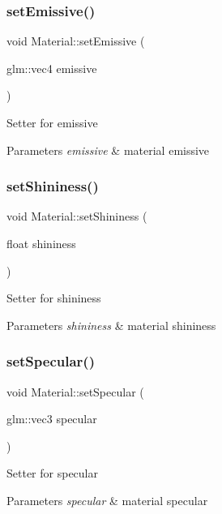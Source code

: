 \subsubsection{\texorpdfstring{set\+Emissive()}{setEmissive()}}
{\footnotesize\ttfamily void Material\+::set\+Emissive (\begin{DoxyParamCaption}\item[{glm\+::vec4}]{emissive }\end{DoxyParamCaption})}

Setter for emissive 
\begin{DoxyParams}{Parameters}
{\em emissive} & material emissive \\
\hline
\end{DoxyParams}
\mbox{\label{classMaterial_a329d0ae8403956a71b1d45b3284f7dd7}} 
\subsubsection{\texorpdfstring{set\+Shininess()}{setShininess()}}
{\footnotesize\ttfamily void Material\+::set\+Shininess (\begin{DoxyParamCaption}\item[{float}]{shininess }\end{DoxyParamCaption})}

Setter for shininess 
\begin{DoxyParams}{Parameters}
{\em shininess} & material shininess \\
\hline
\end{DoxyParams}
\mbox{\label{classMaterial_a7d26a46a86ab91a48a2073f15a3bbdcc}} 
\subsubsection{\texorpdfstring{set\+Specular()}{setSpecular()}}
{\footnotesize\ttfamily void Material\+::set\+Specular (\begin{DoxyParamCaption}\item[{glm\+::vec3}]{specular }\end{DoxyParamCaption})}

Setter for specular 
\begin{DoxyParams}{Parameters}
{\em specular} & material specular \\
\hline
\end{DoxyParams}
\mbox{\label{classMaterial_af769b6b5b214ec476e3036f16b1e4b00}} 
